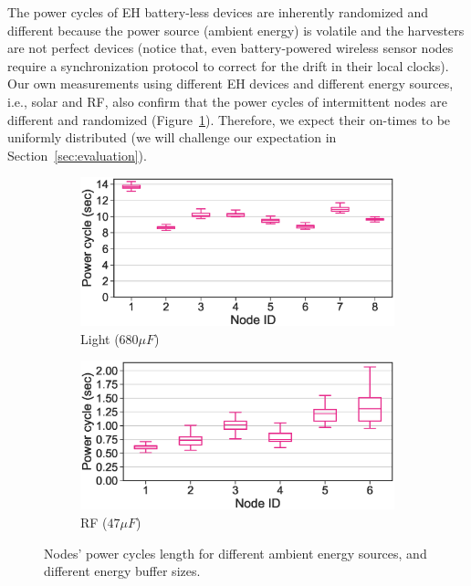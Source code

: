 The power cycles of EH battery-less devices are inherently randomized and different because the power source (ambient energy) is volatile and the harvesters are not perfect devices (notice that, even battery-powered wireless sensor nodes require a synchronization protocol to correct for the drift in their local clocks). Our own measurements using different EH devices and different energy sources, i.e., solar and RF, also confirm that the power cycles of intermittent nodes are different and randomized (Figure~\ref{fig:power_cycles}). Therefore, we expect their on-times to be uniformly distributed (we will challenge our expectation in Section~\ref{sec:evaluation}). 
%
\begin{figure}[t]
		\begin{subfigure}{.49\columnwidth}
			\centering
			\includegraphics[width=\textwidth]{figures/light_power_cycles_len}
			\caption{Light ($680\si{\mu F}$) }
		\end{subfigure}\hfill
		\begin{subfigure}{.49\columnwidth}
			\centering
			\includegraphics[width=\textwidth]{figures/rf_power_cycles_len}
			\caption{RF ($47\si{\mu F}$)}
		\end{subfigure}\hfill
		\caption{Nodes' power cycles length for different ambient energy sources, and different energy buffer sizes.}
		\label{fig:power_cycles}
\end{figure} 
%
